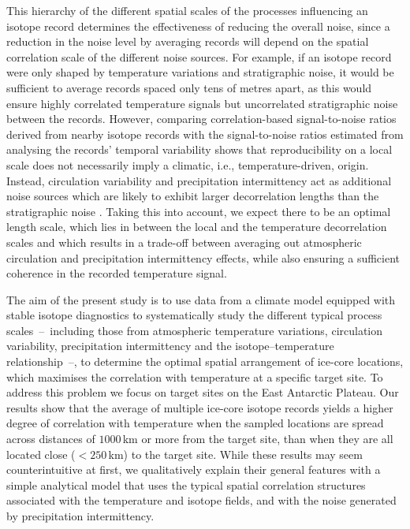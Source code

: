\documentclass[cp, manuscript]{copernicus}
\begin{document}
This hierarchy of the different spatial scales of the processes influencing an
isotope record determines the effectiveness of reducing the overall noise, since
a reduction in the noise level by averaging records will depend on the spatial
correlation scale of the different noise sources. For example, if an isotope
record were only shaped by temperature variations and stratigraphic noise, it
would be sufficient to average records spaced only tens of metres apart, as this
would ensure highly correlated temperature signals but uncorrelated
stratigraphic noise between the records. However, comparing correlation-based
signal-to-noise ratios derived from nearby isotope records
\citep{Munch2016,Munch2017} with the signal-to-noise ratios estimated from
analysing the records' temporal variability \citep{Laepple2018} shows that
reproducibility on a local scale does not necessarily imply a climatic, i.e.,
temperature-driven, origin. Instead, circulation variability and precipitation
intermittency act as additional noise sources which are likely to exhibit larger
decorrelation lengths than the stratigraphic noise
\citep{Laepple2018,Munch2018a}. Taking this into account, we expect there to be
an optimal length scale, which lies in between the local and the temperature
decorrelation scales and which results in a trade-off between averaging out
atmospheric circulation and precipitation intermittency effects, while also
ensuring a sufficient coherence in the recorded temperature signal.

The aim of the present study is to use data from a climate model equipped with
stable isotope diagnostics to systematically study the different typical process
scales~--~including those from atmospheric temperature variations, circulation
variability, precipitation intermittency and the isotope--temperature
relationship~--, to determine the optimal spatial arrangement of ice-core
locations, which maximises the correlation with temperature at a specific target
site. To address this problem we focus on target sites on the East Antarctic
Plateau. Our results show that the average of multiple ice-core isotope records
yields a higher degree of correlation with temperature when the sampled
locations are spread across distances of $1000$\,km or more from the target
site, than when they are all located close ($<250$\,km) to the target
site. While these results may seem counterintuitive at first, we qualitatively
explain their general features with a simple analytical model that uses the
typical spatial correlation structures associated with the temperature and
isotope fields, and with the noise generated by precipitation intermittency.
\end{document}
